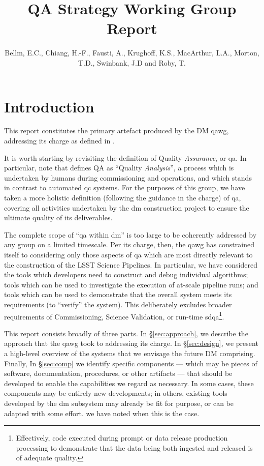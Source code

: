 \documentclass[DM,authoryear,toc,lsstdraft]{lsstdoc}
\title{QA Strategy Working Group Report}
\author{%
Bellm, E.C.,
Chiang, H.-F.,
Fausti, A.,
Krughoff, K.S.,
MacArthur, L.A.,
Morton, T.D.,
Swinbank, J.D and
Roby, T.
}
\date{\vcsDate}
\begin{document}
\maketitle

\section{Introduction}
\label{sec:intro}

This report constitutes the primary artefact produced by the DM \gls{qawg},
addressing its charge as defined in .

It is worth starting by revisiting the definition of Quality
\textit{Assurance}, or \gls{qa}.  In particular, note that 
defines QA as ``Quality \textit{Analysis}'', a process which is undertaken by
humans during commissioning and operations, and which stands in contrast to
automated \gls{qc} systems. For the purposes of this group, we have taken a
more holistic definition (following the guidance in the charge) of \gls{qa},
covering all activities undertaken by the \gls{dm} construction project to
ensure the ultimate quality of its deliverables.

The complete scope of ``\gls{qa} within \gls{dm}'' is too large to be
coherently addressed by any group on a limited timescale. Per its charge,
then, the \gls{qawg} has constrained itself to considering only those aspects
of \gls{qa} which are most directly relevant to the construction of the LSST
Science Pipelines. In particular, we have considered the tools which
developers need to construct and debug individual algorithms; tools which can
be used to investigate the execution of at-scale pipeline runs; and tools
which can be used to demonstrate that the overall system meets its
requirements (to ``verify'' the system). This deliberately excludes broader
requirements of Commissioning, Science Validation, or run-time
\gls{sdqa}\footnote{Effectively, code executed during prompt or data release
production processing to demonstrate that the data being both ingested and
released is of adequate quality.}.

This report consists broadly of three parts. In \S\ref{sec:approach}, we
describe the approach that the \gls{qawg} took to addressing its charge. In
\S\ref{sec:design}, we present a high-level overview of the systems that we
envisage the future DM comprising. Finally, In \S\ref{sec:comp} we identify
specific components --- which may be pieces of software, documentation,
procedures, or other artifacts --- that should be developed to enable the
capabilities we regard as necessary. In some cases, these components may be
entirely new developments; in others, existing tools developed by the \gls{dm}
subsystem may already be fit for purpose, or can be adapted with some effort.
we have noted when this is the case.
\end{document}
